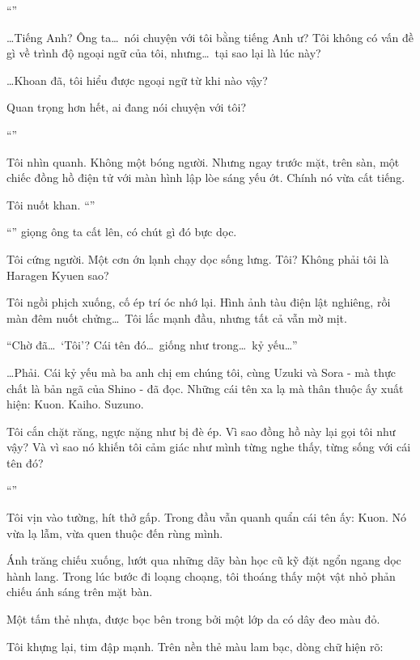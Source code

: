 \documentclass[../main.tex]{subfiles}
\begin{document}
``''

\dots Tiếng Anh? Ông ta\dots\ nói chuyện với tôi bằng tiếng Anh ư? Tôi không có vấn đề gì về trình độ ngoại ngữ của tôi, nhưng\dots\ tại sao lại là lúc này?

\dots Khoan đã, tôi hiểu được ngoại ngữ từ khi nào vậy?

Quan trọng hơn hết, ai đang nói chuyện với tôi?

``''

Tôi nhìn quanh. Không một bóng người. Nhưng ngay trước mặt, trên sàn, một chiếc đồng hồ điện tử với màn hình lập lòe sáng yếu ớt. Chính nó vừa cất tiếng.

Tôi nuốt khan. ``''

``'' giọng ông ta cất lên, có chút gì đó bực dọc.

Tôi cứng người. Một cơn ớn lạnh chạy dọc sống lưng. Tôi? Không phải tôi là Haragen Kyuen sao?

Tôi ngồi phịch xuống, cố ép trí óc nhớ lại. Hình ảnh tàu điện lật nghiêng, rồi màn đêm nuốt chửng\dots\ Tôi lắc mạnh đầu, nhưng tất cả vẫn mờ mịt.

``Chờ đã\dots\ `Tôi'? Cái tên đó\dots\ giống như trong\dots\ kỷ yếu\dots''

\dots Phải. Cái kỷ yếu mà ba anh chị em chúng tôi, cùng Uzuki và Sora - mà thực chất là bản ngã của Shino - đã đọc. Những cái tên xa lạ mà thân thuộc ấy xuất hiện: Kuon. Kaiho. Suzuno.

Tôi cắn chặt răng, ngực nặng như bị đè ép. Vì sao đồng hồ này lại gọi tôi như vậy? Và vì sao nó khiến tôi cảm giác như mình từng nghe thấy, từng sống với cái tên đó?

``''

Tôi vịn vào tường, hít thở gấp. Trong đầu vẫn quanh quẩn cái tên ấy: Kuon. Nó vừa lạ lẫm, vừa quen thuộc đến rùng mình.

Ánh trăng chiếu xuống, lướt qua những dãy bàn học cũ kỹ đặt ngổn ngang dọc hành lang. Trong lúc bước đi loạng choạng, tôi thoáng thấy một vật nhỏ phản chiếu ánh sáng trên mặt bàn.

Một tấm thẻ nhựa, được bọc bên trong bởi một lớp da có dây đeo màu đỏ.

Tôi khựng lại, tim đập mạnh. Trên nền thẻ màu lam bạc, dòng chữ hiện rõ:
\end{document}
